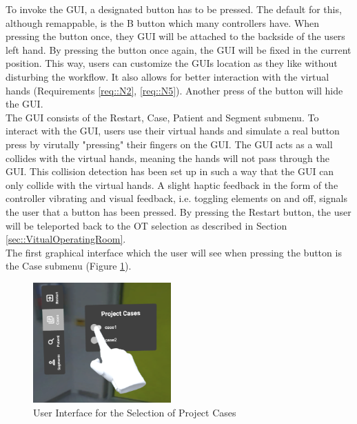 To invoke the GUI, a designated button has to be pressed.
The default for this, although remappable, is the B button which many controllers have.
When pressing the button once, they GUI will be attached to the backside of the users left hand.
By pressing the button once again, the GUI will be fixed in the current position.
This way, users can customize the GUIs location as they like without disturbing the workflow.
It also allows for better interaction with the virtual hands (Requirements \ref{req::N2}, \ref{req::N5}).
Another press of the button will hide the GUI.
\\ The GUI consists of the Restart, Case, Patient and Segment submenu.
To interact with the GUI, users use their virtual hands and simulate a real button press by virutally "pressing" their fingers on the GUI.
The GUI acts as a wall collides with the virtual hands, meaning the hands will not pass through the GUI.
This collision detection has been set up in such a way that the GUI can only collide with the virtual hands.
A slight haptic feedback in the form of the controller vibrating and visual feedback, i.e. toggling elements on and off, signals the user that a button has been pressed.
By pressing the Restart button, the user will be teleported back to the OT selection as described in Section \ref{sec::VitualOperatingRoom}.
\\ The first graphical interface which the user will see when pressing the button is the Case submenu (Figure \ref{fig::UIProjectCase}).
\begin{figure}[ht]
    \centering
    \includegraphics[width=200px]{images/implementation/user_interface/project_cases.png}
    \caption{\label{fig::UIProjectCase}User Interface for the Selection of Project Cases}
\end{figure}

